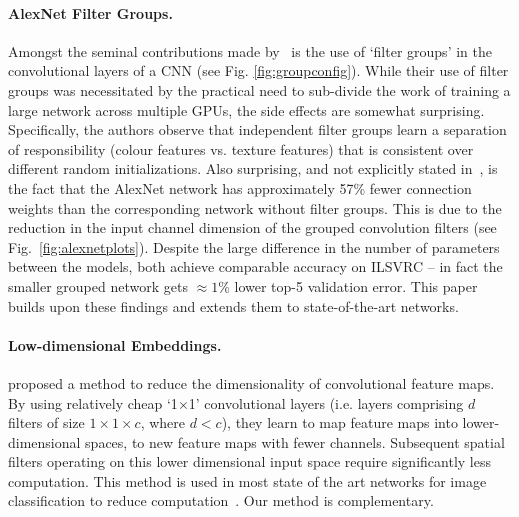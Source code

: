 \documentclass[thesis]{subfiles}
\begin{document}
	\paragraph{AlexNet Filter Groups.} Amongst the seminal contributions made by \citet{Krizhevsky2012}~is the use of `filter groups' in the convolutional layers of a CNN (see Fig. \ref{fig:groupconfig}). While their use of filter groups was necessitated by the practical need to sub-divide the work of training a large network across multiple GPUs, the side effects are somewhat surprising. Specifically, the authors observe that independent filter groups learn a separation of responsibility (colour features vs. texture features) that is consistent over different random initializations. Also surprising, and not explicitly stated in~\citep{Krizhevsky2012}, is the fact that the AlexNet network has approximately 57\% fewer connection weights than the corresponding network without filter groups. This is due to the reduction in the input channel dimension of the grouped convolution filters (see Fig.~\ref{fig:alexnetplots}).
	Despite the large difference in the number of parameters between the models, both achieve comparable accuracy on ILSVRC -- in fact the smaller grouped network gets $\approx1$\% lower top-5 validation error. This paper builds upon these findings and extends them to state-of-the-art networks.
	
	\paragraph{Low-dimensional Embeddings.}
	\citet{Lin2013NiN} proposed a method to reduce the dimensionality of convolutional feature maps. 
	By using relatively cheap `1$\times$1' convolutional layers (i.e. layers comprising $d$ filters of size $1\times 1 \times c$, where $d<c$), they learn to map feature maps into lower-dimensional spaces, \ie to new feature maps with fewer channels. Subsequent spatial filters operating on this lower dimensional input space require significantly less computation. This method is used in most state of the art networks for image classification to reduce computation~\citep{Szegedy2014going,He2015}. Our method is complementary.
	
\end{document}
